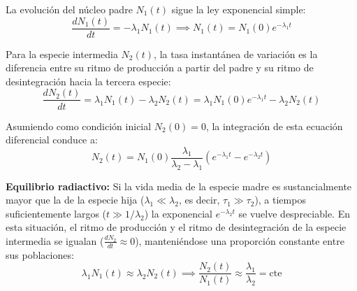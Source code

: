 \begin{center}
\end{center}

La evolución del núcleo padre $N_1(t)$ sigue la ley exponencial simple:
\begin{equation}
\frac{dN_1(t)}{dt} = -\lambda_1 N_1(t) \implies N_1(t) = N_1(0) e^{-\lambda_1 t}
\end{equation}

Para la especie intermedia $N_2(t)$, la tasa instantánea de variación es la diferencia entre su ritmo de producción a partir del padre y su ritmo de desintegración hacia la tercera especie:
\begin{equation}
\frac{dN_2(t)}{dt} = \lambda_1 N_1(t) - \lambda_2 N_2(t) = \lambda_1 N_1(0) e^{-\lambda_1 t} - \lambda_2 N_2(t)
\end{equation}

Asumiendo como condición inicial $N_2(0) = 0$, la integración de esta ecuación diferencial conduce a:
\begin{equation}
N_2(t) = N_1(0) \frac{\lambda_1}{\lambda_2 - \lambda_1} \left( e^{-\lambda_1 t} - e^{-\lambda_2 t} \right)
\end{equation}

\textbf{Equilibrio radiactivo:}
Si la vida media de la especie madre es sustancialmente mayor que la de la especie hija ($\lambda_1 \ll \lambda_2$, es decir, $\tau_1 \gg \tau_2$), a tiempos suficientemente largos ($t \gg 1/\lambda_2$) la exponencial $e^{-\lambda_2 t}$ se vuelve despreciable. En esta situación, el ritmo de producción y el ritmo de desintegración de la especie intermedia se igualan ($\frac{dN_2}{dt} \approx 0$), manteniéndose una proporción constante entre sus poblaciones:
\begin{equation}
\lambda_1 N_1(t) \approx \lambda_2 N_2(t) \implies \frac{N_2(t)}{N_1(t)} \approx \frac{\lambda_1}{\lambda_2} = \text{cte}
\end{equation}

